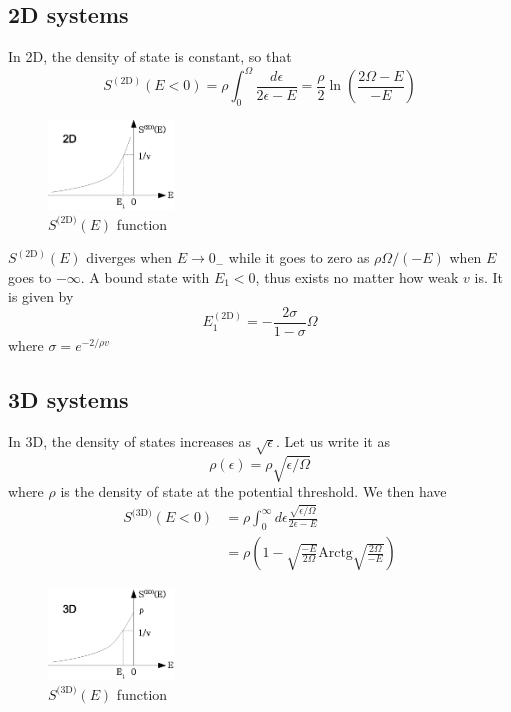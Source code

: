\documentclass{article}
\newcommand{\td}{{\ensuremath{{\text{(2D)}}}}}
\newcommand{\sd}{{\ensuremath{{\text{(3D)}}}}}
\newcommand{\Arctg}{\ensuremath{\text{Arctg}}}
\begin{document}
\subsection{2D systems}
In 2D, the density of state is constant, so that 
\begin{equation}
S^{(\text{2D})}(E<0)=\rho\int_0^{\Omega}\frac{d\epsilon}{2\epsilon-E}=\frac{\rho}{2}\ln\left(\frac{2\Omega-E}{-E}\right)
\label{eq:}
\end{equation}
\begin{figure}[htbp]
	\centering
		\includegraphics[width=0.30\textwidth]{2dOnePair.eps}
	\caption{$S^\td(E)$ function}
	\label{fig:2dOnePair}
\end{figure}

$S^{(\text{2D})}(E)$ diverges when $E\rightarrow{}0_{-}$ while it goes to zero as $\rho\Omega/(-E)$ when $E$ goes to $-\infty$. A bound state with $E_1<0$, thus exists no matter how weak $v$ is. It is given by 
\begin{equation}
E_1^{(\text{2D})}=-\frac{2\sigma}{1-\sigma}\Omega
\label{eq:}
\end{equation}
where $\sigma=e^{-2/\rho{v}}$



\subsection{3D systems}
In 3D, the density of states increases as $\sqrt{\epsilon}$. Let us write it as 
\begin{equation}
\rho(\epsilon)=\rho\sqrt{\epsilon/\Omega}
\label{eq:}
\end{equation}
where $\rho$ is the density of state at the potential threshold. We then have
\begin{equation}
\begin{split}
S^\sd(E<0)&=\rho\int_0^\infty{}d\epsilon\frac{\sqrt{\epsilon/\Omega}}{2\epsilon-E}\\
	&=\rho(1-\sqrt{\frac{-E}{2\Omega}}\Arctg\sqrt{\frac{2\Omega}{-E}})
\label{eq:}
\end{split}
\end{equation}
\begin{figure}[htbp]
	\centering
		\includegraphics[width=0.30\textwidth]{3dOnePair.eps}
	\caption{$S^\sd(E)$ function}
	\label{fig:3dOnePair}
\end{figure}
\end{document}
